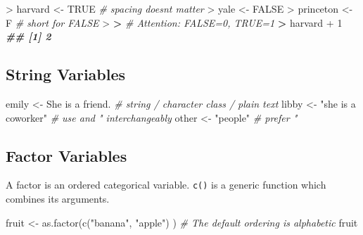 \documentclass[
]{book}
\newenvironment{Shaded}{\begin{snugshade}}{\end{snugshade}}
\newcommand{\CommentTok}[1]{\textcolor[rgb]{0.56,0.35,0.01}{\textit{#1}}}
\newcommand{\ConstantTok}[1]{\textcolor[rgb]{0.00,0.00,0.00}{#1}}
\newcommand{\DecValTok}[1]{\textcolor[rgb]{0.00,0.00,0.81}{#1}}
\newcommand{\DocumentationTok}[1]{\textcolor[rgb]{0.56,0.35,0.01}{\textbf{\textit{#1}}}}
\newcommand{\ErrorTok}[1]{\textcolor[rgb]{0.64,0.00,0.00}{\textbf{#1}}}
\newcommand{\FunctionTok}[1]{\textcolor[rgb]{0.00,0.00,0.00}{#1}}
\newcommand{\NormalTok}[1]{#1}
\newcommand{\OtherTok}[1]{\textcolor[rgb]{0.56,0.35,0.01}{#1}}
\newcommand{\SpecialCharTok}[1]{\textcolor[rgb]{0.00,0.00,0.00}{#1}}
\newcommand{\StringTok}[1]{\textcolor[rgb]{0.31,0.60,0.02}{#1}}
\begin{document}
\begin{Shaded}
\begin{Highlighting}[]
\SpecialCharTok{\textgreater{}}\NormalTok{ harvard               }\OtherTok{\textless{}{-}}        \ConstantTok{TRUE} \CommentTok{\# spacing doesn\textquotesingle{}t matter}
\SpecialCharTok{\textgreater{}}\NormalTok{ yale      }\OtherTok{\textless{}{-}} \ConstantTok{FALSE}
\SpecialCharTok{\textgreater{}}\NormalTok{ princeton }\OtherTok{\textless{}{-}}\NormalTok{ F }\CommentTok{\# short for FALSE}
\SpecialCharTok{\textgreater{}} 
\ErrorTok{\textgreater{}} \CommentTok{\# Attention: FALSE=0, TRUE=1}
\ErrorTok{\textgreater{}}\NormalTok{ harvard }\SpecialCharTok{+} \DecValTok{1}
\DocumentationTok{\#\# [1] 2}
\end{Highlighting}
\end{Shaded}

\hypertarget{string-variables}{%
\subsection*{String Variables}\label{string-variables}}

\begin{Shaded}
\begin{Highlighting}[]
\NormalTok{emily  }\OtherTok{\textless{}{-}} \StringTok{\textquotesingle{}She is a friend.\textquotesingle{}}     \CommentTok{\# string / character class / plain text}
\NormalTok{libby  }\OtherTok{\textless{}{-}} \StringTok{"she is a coworker"}    \CommentTok{\# use \textquotesingle{} and " interchangeably}
\NormalTok{other  }\OtherTok{\textless{}{-}} \StringTok{"people"}               \CommentTok{\# prefer "}
\end{Highlighting}
\end{Shaded}

\hypertarget{factor-variables}{%
\subsection*{Factor Variables}\label{factor-variables}}

A factor is an ordered categorical variable. \texttt{c()} is a generic function which combines its arguments.

\begin{Shaded}
\begin{Highlighting}[]
\NormalTok{fruit  }\OtherTok{\textless{}{-}} \FunctionTok{as.factor}\NormalTok{(}\FunctionTok{c}\NormalTok{(}\StringTok{"banana"}\NormalTok{, }\StringTok{"apple"}\NormalTok{)  ) }\CommentTok{\# The default ordering is alphabetic}
\NormalTok{fruit}
\end{Highlighting}
\end{Shaded}
\end{document}
